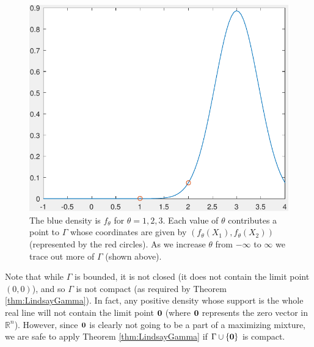 \begin{figure}[ht]
\begin{minipage}[b]{0.3\linewidth}
				\includegraphics[width=\textwidth]{GammaTraceDensity03}
			\end{minipage}
			\caption{The blue density is $f_\theta$ for $\theta = 1,2,3$. Each value of $\theta$ contributes a point to $\Gamma$ whose coordinates are given by $(f_\theta(X_1),f_\theta(X_2))$ (represented by the red circles). As we increase $\theta$ from $-\infty$ to $\infty$ we trace out more of $\Gamma$ (shown above).}\label{fig:TracingGamma}
		\end{figure}

		Note that while $\Gamma$ is bounded, it is not closed (it does not contain the limit point $(0,0)$), and so $\Gamma$ is not compact (as required by Theorem \ref{thm:LindsayGamma}). In fact, any positive density whose support is the whole real line will not contain the limit point ${\bm{{0}}}$ (where ${\bm{{0}}}$ represents the zero vector in $\mathbb{R}^n$). However, since ${\bm{{0}}}$ is clearly not going to be a part of a maximizing mixture, we are safe to apply Theorem \ref{thm:LindsayGamma} if $\Gamma \cup \{ {\bm{{0}}} \}$ is compact.


